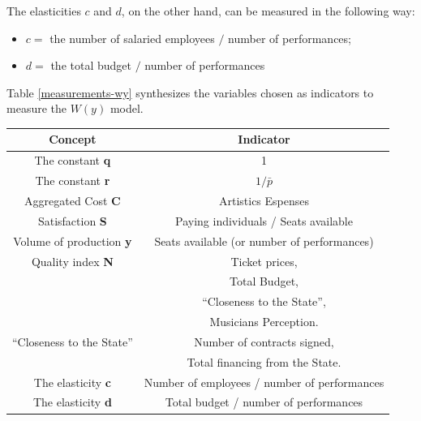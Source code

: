 \documentclass[a4paper, 12pt, openright, oneside, german, french, brazil, english]{abntex2}
\begin{document}
        The elasticities $c$ and $d$, on the other hand, can be measured in the following way:

        \begin{itemize}
        \item $c =$ the number of salaried employees $/$ number of performances;
        \item $d =$ the total budget $/$ number of performances
        \end{itemize}

        Table \ref{measurements-wy} synthesizes the variables chosen as indicators to measure the $W(y)$ model.

        \begin{table}
         {\begin{tabular}{|c|c|}
				
            \hline
            \textbf{Concept} & \textbf{Indicator} \\
            \hline
            The constant \textbf{q} & 1 \\
            \hline
            The constant \textbf{r} &  $1/\bar{p}$ \\
            \hline
            Aggregated Cost \textbf{C} & Artistics Espenses \\
            \hline
            Satisfaction \textbf{S} & Paying individuals / Seats available \\
            \hline
            Volume of production \textbf{y} & Seats available (or number of performances) \\
            \hline
            Quality index \textbf{N} & Ticket prices, \\
                                     & Total Budget, \\
                                     & ``Closeness to the State'', \\
                                     & Musicians Perception. \\
            \hline
            ``Closeness to the State'' & Number of contracts signed, \\
                                     & Total financing from the State. \\
            \hline
            The elasticity \textbf{c} & Number of employees / number of performances \\
            \hline
            The elasticity \textbf{d} & Total budget / number of performances\\
            \hline
	\end{tabular}
	}
	{}
      \end{table}
	
\end{document}
